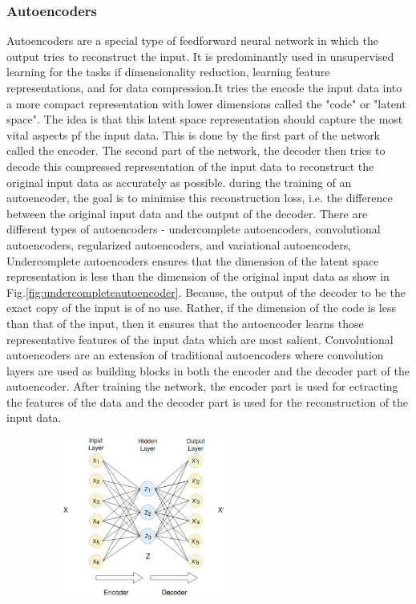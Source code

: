 {\subsubsection{Autoencoders}
Autoencoders are a special type of feedforward neural network in which the output tries to reconstruct the input. It is predominantly used in unsupervised learning for the tasks if dimensionality reduction, learning feature representations, and for data compression.It tries the encode the input data into a more compact representation with lower dimensions called the "code"\cite*{Goodfellow-et-al-2016} or "latent space". The idea is that this latent space representation should capture the most vital aspects pf the input data. This is done by the first part of the network called the encoder. The second part of the network, the decoder then tries to decode this compressed representation of the input data to reconstruct the original input data as accurately as possible. during the training of an autoencoder, the goal is to minimise this reconstruction loss, i.e. the difference between the original input data and the output of the decoder. There are different types of autoencoders - undercomplete autoencoders, convolutional autoencoders, regularized autoencoders, and variational autoencoders, \\
Undercomplete autoencoders ensures that the dimension of the latent space representation is less than the dimension of the original input data as show in Fig.\ref*{fig:undercompleteautoencoder}. Because, the output of the decoder to be the exact copy of the input is of no use. Rather, if the dimension of the code is less than that of the input, then it ensures that the autoencoder learns those representative features of the input data which are most salient\cite*{Goodfellow-et-al-2016}. Convolutional autoencoders are an extension of traditional autoencoders where convolution layers are used as building blocks in both the encoder and the decoder part of the autoencoder. After training the network, the encoder part is used for ectracting the features of the data and the decoder part is used for the reconstruction of the input data. \\
\begin{figure}
    \centering
    \begin{minipage}[t]{.45\textwidth}
      \centering
      \includegraphics[width=200pt,height=150pt]{pictures/undercomplete_autoencoder.png}

\end{minipage}
\end{figure}}
